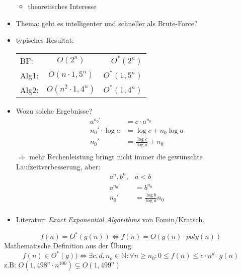 \begin{itemize}
\begin{itemize}
    \item theoretisches Interesse
   \end{itemize}
   \item Thema: geht es intelligenter und schneller als Brute-Force?
   \item typisches Resultat: \\
   \begin{tabular}{lcr}
      BF: &$O(2^n)$ & $O^*(2^n)$\\ 
      Alg1: &$O(n\cdot 1,5^n)$ &$O^*(1,5^n)$\\ 
      Alg2: &$O(n^2\cdot 1,4^n)$ &$O^*(1,4^n)$\\
   \end{tabular}
   \item Wozu solche Ergebnisse?
   \begin{align*}
    a^{n_0'} &= c\cdot a^{n_0}\\
    n_0' \cdot \log a &= \log c + n_0 \log a\\
    n_0' &= \frac{\log c}{\log a} + n_0\\
   \end{align*}
   $\Rightarrow$ mehr Rechenleistung bringt nicht immer die gewünschte Laufzeitverbesserung, aber:
   \begin{align*}
    a^n, b^n, &a < b\\
    a^{n_0'} &= b^{n_0}\\
    n_0' &= \frac{\log b}{\log a} n_0\\
   \end{align*}
   \item Literatur: \textit{Exact Exponential Algorithms} von Fomin/Kratsch.
  \end{itemize}
  
  \begin{definition}[$O^*$-Notation]
   \[f(n) = O^*(g(n)) \Leftrightarrow f(n) = O(g(n)\cdot poly(n))\]
   Mathematische Definition aus der Übung:
   \[f(n) \in O^*(g)) \Leftrightarrow  \exists c,d,n_o \in \mathbb{N}: \forall n \geq n_0: 0 \leq f(n) \leq c\cdot n^d\cdot g(n)\]
   z.B: $O(1,498^n\cdot n^{100}) \subsetneq O(1,499^n)$
  \end{definition}

